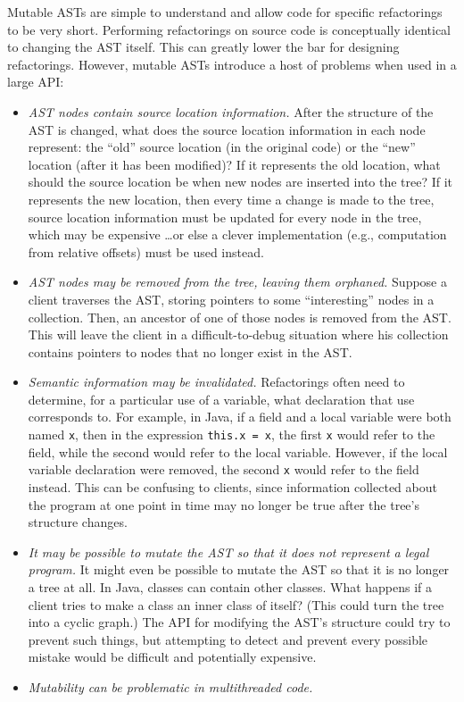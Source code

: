 \documentclass[prodmode]{acmlarge}
\newcommand{\ttt}[1]{\texttt{#1}}
\begin{document}
Mutable ASTs are simple to understand and allow code for specific refactorings
to be very short. Performing refactorings on source code is conceptually
identical to changing the AST itself. This can greatly lower the bar for 
designing refactorings. However, mutable ASTs introduce a host of problems when
used in a large API:

\begin{itemize}
\item \textit{AST nodes contain source location information.}  After the
structure of the AST is changed, what does the source location information in
each node represent: the ``old'' source location (in the original code) or the
``new'' location (after it has been modified)?  If it represents the old
location, what should the source location be when new nodes are inserted into
the tree?  If it represents the new location, then every time a change is made
to the tree, source location information must be updated for every node in the
tree, which may be expensive \dots or else a clever implementation (e.g.,
computation from relative offsets) must be used instead.
\item \textit{AST nodes may be removed from the tree, leaving them orphaned.}
Suppose a client traverses the AST, storing pointers to some ``interesting''
nodes in a collection.  Then, an ancestor of one of those nodes is removed from
the AST.  This will leave the client in a difficult-to-debug situation where
his collection contains pointers to nodes that no longer exist in the AST.
\item \textit{Semantic information may be invalidated.}  Refactorings often
need to determine, for a particular use of a variable, what declaration that
use corresponds to.  For example, in Java, if a field and a local variable were
both named \ttt{x}, then in the expression \ttt{this.x = x}, the first \ttt{x}
would refer to the field, while the second would refer to the local variable.
However, if the local variable declaration were removed, the second \ttt{x}
would refer to the field instead.  This can be confusing to clients, since
information collected about the program at one point in time may no longer be
true after the tree's structure changes.
\item \textit{It may be possible to mutate the AST so that it does not
represent a legal program.}  It might even be possible to mutate the AST so
that it is no longer a tree at all.  In Java, classes can contain other
classes.  What happens if a client tries to make a class an inner class of
itself?  (This could turn the tree into a cyclic graph.)  The API for modifying
the AST's structure could try to prevent such things, but attempting to detect
and prevent every possible mistake would be difficult and potentially
expensive.
\item \textit{Mutability can be problematic in multithreaded code.}
\end{itemize}
\end{document}

